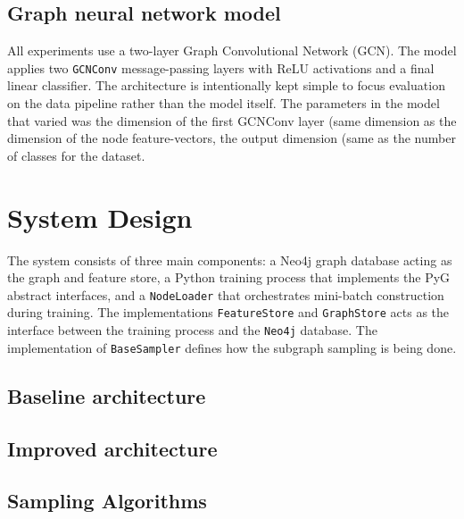 \documentclass[ oneside,openright,titlepage,numbers=noenddot,headinclude,%
                footinclude=true,cleardoublepage=empty,abstractoff, %
                BCOR=0mm,paper=a4,fontsize=11pt,%
                ngerman,american,%
                ]{scrreprt}
\begin{document}
\section{Graph neural network model}\label{sec:model}

All experiments use a two-layer Graph Convolutional Network ({GCN}). The
model applies two \texttt{GCNConv} message-passing layers with {ReLU}
activations and a final linear classifier. The architecture is intentionally kept
simple to focus evaluation on the data pipeline rather than the model itself. The parameters in the model that varied was the dimension of the first GCNConv layer (same dimension as the dimension of the node feature-vectors, the output dimension (same as the number of classes for the dataset.



\chapter{System Design}\label{sec:sys_arch}

The system consists of three main components: a Neo4j graph database acting as the
graph and feature store, a Python training process that implements the PyG abstract
interfaces, and a \texttt{NodeLoader} that orchestrates mini-batch construction during
training. The implementations \texttt{FeatureStore} and \texttt{GraphStore} acts as the interface
between the training process and the \texttt{Neo4j} database. The implementation of \texttt{BaseSampler}
defines how the subgraph sampling is being done.



\section{Baseline architecture}

\section{Improved architecture}

\section{Sampling Algorithms}\label{sec:sampling_algs}
\end{document}
